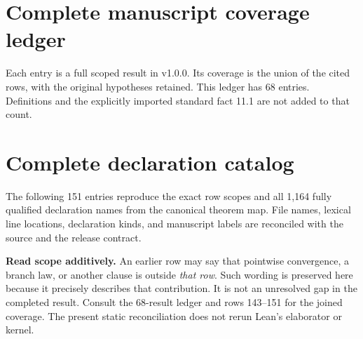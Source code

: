 \KomorebiCover
{}


\begingroup\small
\tableofcontents
\endgroup
\clearpage
{}

\clearpage
\clearpage
\clearpage
\clearpage
\clearpage
\clearpage
\clearpage
\clearpage
\section{Complete manuscript coverage ledger}
\label{sec:ledger}
Each entry is a full scoped result in v1.0.0. Its coverage is the union of the cited rows, with the original hypotheses retained. This ledger has 68 entries. Definitions and the explicitly imported standard fact 11.1 are not added to that count.

\clearpage
\section{Complete declaration catalog}
\label{sec:catalog}
The following 151 entries reproduce the exact row scopes and all 1,164 fully qualified declaration names from the canonical theorem map. File names, lexical line locations, declaration kinds, and manuscript labels are reconciled with the source and the release contract.

\textbf{Read scope additively.} An earlier row may say that pointwise convergence, a branch law, or another clause is outside \emph{that row}. Such wording is preserved here because it precisely describes that contribution. It is not an unresolved gap in the completed result. Consult the 68-result ledger and rows 143--151 for the joined coverage. The present static reconciliation does not rerun Lean's elaborator or kernel.

\clearpage
